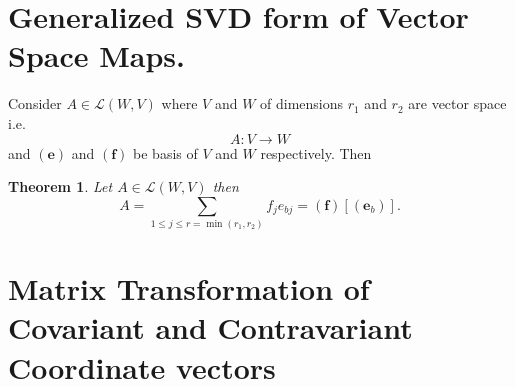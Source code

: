 \documentclass[aps,preprint]{revtex4}
\newtheorem{theorem}{Theorem}
\begin{document}
\section{Generalized SVD form of Vector Space Maps.}

Consider $A\in \mathcal{L}\left( W,V\right) $ where $V$ and $W$ of
dimensions $r_{1}$ and $r_{2}$ are vector space i.e. 
\begin{equation}
A:V\rightarrow W
\end{equation}%
and $\left( \boldsymbol{e}\right) $ and $\left( \boldsymbol{f}\right) $ be
basis of $V$ and $W$ respectively. Then

\begin{theorem}
Let $A\in \mathcal{L}\left( W,V\right) $ then 
\begin{equation}
A=\sum_{1\leq j\leq r=\min \left( r_{1},r_{2}\right) }f_{j}e_{bj}=\left( 
\boldsymbol{f}\right) \left[ \left( \boldsymbol{e}_{b}\right) \right] .
\end{equation}
\end{theorem}

\section{Matrix Transformation of Covariant and Contravariant Coordinate
vectors}
\end{document}
